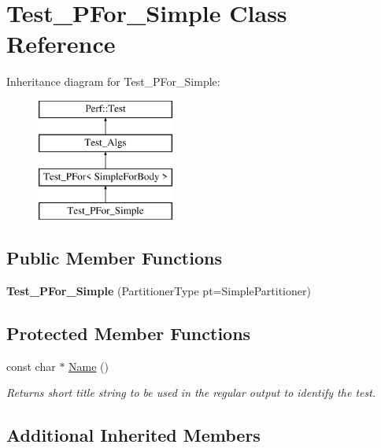 \hypertarget{classTest__PFor__Simple}{}\section{Test\+\_\+\+P\+For\+\_\+\+Simple Class Reference}
\label{classTest__PFor__Simple}
Inheritance diagram for Test\+\_\+\+P\+For\+\_\+\+Simple\+:\begin{figure}[H]
\begin{center}
\leavevmode
\includegraphics[height=4.000000cm]{classTest__PFor__Simple}
\end{center}
\end{figure}
\subsection*{Public Member Functions}
\begin{DoxyCompactItemize}
\item 
\hypertarget{classTest__PFor__Simple_aad2124df2d54494142d6c753fac7cd06}{}{\bfseries Test\+\_\+\+P\+For\+\_\+\+Simple} (Partitioner\+Type pt=Simple\+Partitioner)\label{classTest__PFor__Simple_aad2124df2d54494142d6c753fac7cd06}

\end{DoxyCompactItemize}
\subsection*{Protected Member Functions}
\begin{DoxyCompactItemize}
\item 
const char $\ast$ \hyperlink{classTest__PFor__Simple_abf441e1a65196b8bb6c78cff98ba1ee7}{Name} ()
\begin{DoxyCompactList}\small\item\em Returns short title string to be used in the regular output to identify the test. \end{DoxyCompactList}\end{DoxyCompactItemize}
\subsection*{Additional Inherited Members}


